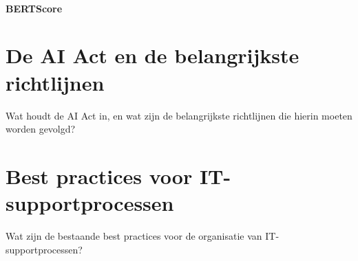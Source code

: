    \paragraph{BERTScore}

\section{De AI Act en de belangrijkste richtlijnen}
Wat houdt de AI Act in, en wat zijn de belangrijkste richtlijnen die hierin moeten worden gevolgd?

\section{Best practices voor IT-supportprocessen}
Wat zijn de bestaande best practices voor de organisatie van IT-supportprocessen?
